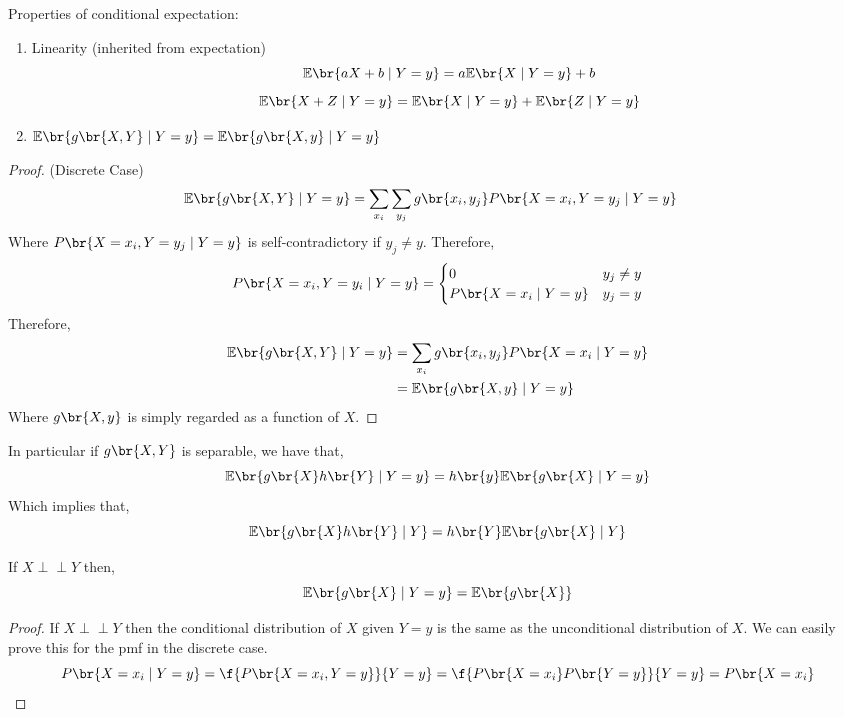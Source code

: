 \documentclass{article}
\newcommand{\indep}{\!\!\perp\!\!\!\!\perp\!\!}
\newcommand{\Exp}{\mathbb{E}}
\begin{document}
\begin{theorem}
    Properties of conditional expectation:
    \begin{enumerate}
        \item Linearity (inherited from expectation)
        \[ \Exp\br{aX+b \mid Y=y} = a\Exp\br{X \mid Y=y} + b \]
        \[ \Exp\br{X+Z \mid Y=y} = \Exp\br{X \mid Y=y} + \Exp\br{Z \mid Y=y} \]
        \item $\Exp\br{g\br{X,Y} \mid Y = y} = \Exp\br{g\br{X,y} \mid Y = y}$
    \end{enumerate}
\end{theorem}

\begin{proof}
    (Discrete Case)
    \begin{align*}
        \Exp\br{g\br{X,Y} \mid Y = y} &= \sum_{x_i}\sum_{y_j} g\br{x_i, y_j} P\br{X=x_i, Y=y_j \mid Y=y}
    \end{align*}
    Where $P\br{X=x_i, Y=y_j \mid Y=y}$ is self-contradictory if $y_j \neq y$. Therefore,
    \[ P\br{X=x_i, Y=y_i \mid Y=y} = \begin{cases}
        0 & y_j \neq y \\
        P\br{X=x_i \mid Y=y} & y_j = y
    \end{cases} \]
    Therefore,
    \begin{align*}
        \Exp\br{g\br{X,Y} \mid Y = y} &= \sum_{x_i}g\br{x_i, y_j} P\br{X=x_i \mid Y=y} \\
        &= \Exp\br{g\br{X,y} \mid Y = y}
    \end{align*}
    Where $g\br{X,y}$ is simply regarded as a function of $X$.
\end{proof}

\begin{remark}
    In particular if $g\br{X,Y}$ is separable, we have that,
    \[ \Exp\br{g\br{X}h\br{Y} \mid Y = y} = h\br{y}\Exp\br{g\br{X} \mid Y = y}  \]
    Which implies that,
    \[ \Exp\br{g\br{X}h\br{Y} \mid Y} = h\br{Y}\Exp\br{g\br{X} \mid Y}  \]
\end{remark}

\begin{theorem}
    If $X \indep Y$ then,
    \[ \Exp\br{g\br{X} \mid Y= y} = \Exp\br{g\br{X}} \]
\end{theorem}

\begin{proof}
    If $X \indep Y$ then the conditional distribution of $X$ given $Y=y$ is the same as the unconditional distribution of $X$. We can easily prove this for the pmf in the discrete case.
    \[ P\br{X = x_i \mid Y = y} = \f{P\br{X = x_i, Y = y}}{Y=y} = \f{P\br{X = x_i}P\br{Y = y}}{Y=y} = P\br{X = x_i} \]
\end{proof}
\end{document}
